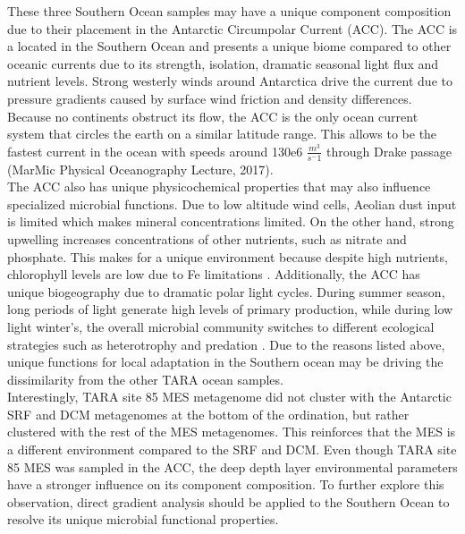 These three Southern Ocean samples may have a unique component composition due to their placement in the Antarctic Circumpolar Current (ACC). The ACC is a located in the Southern Ocean and presents a unique biome compared to other oceanic currents due to its strength, isolation, dramatic seasonal light flux and nutrient levels. Strong westerly winds around Antarctica drive the current due to pressure gradients caused by surface wind friction and density differences. Because no continents obstruct its flow, the ACC is the only ocean current system that circles the earth on a similar latitude range. This allows to be the fastest current in the ocean with speeds around 130e6 $\frac{m^3}{s^-1}$ through Drake passage (MarMic Physical Oceanography Lecture, 2017).\\

The ACC also has unique physicochemical properties that may also influence specialized microbial functions. Due to low altitude wind cells, Aeolian dust input is limited which makes mineral concentrations limited. On the other hand, strong upwelling increases concentrations of other nutrients, such as nitrate and phosphate. This makes for a unique environment because despite high nutrients, chlorophyll levels are low due to Fe limitations \citep{Martin_1990, Tagliabue_2014, Cavicchioli_2015}. Additionally, the ACC has unique biogeography due to dramatic polar light cycles. During summer season, long periods of light generate high levels of primary production, while during low light winter's, the overall microbial community switches to different ecological strategies such as heterotrophy and predation \citep{Wilkins_2013, Milici_2017}. Due to the reasons listed above, unique functions for local adaptation in the Southern ocean may be driving the dissimilarity from the other TARA ocean samples.\\

Interestingly, TARA site 85 MES metagenome did not cluster with the Antarctic SRF and DCM metagenomes at the bottom of the ordination, but rather clustered with the rest of the MES metagenomes. This reinforces that the MES is a different environment compared to the SRF and DCM. Even though TARA site 85 MES was sampled in the ACC, the deep depth layer environmental parameters have a stronger influence on its component composition. To further explore this observation, direct gradient analysis should be applied to the Southern Ocean to resolve its unique microbial functional properties.\\

